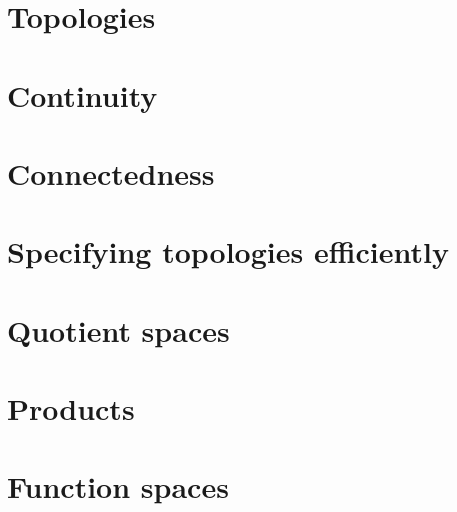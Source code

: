 \documentclass[a4paper,nobib,nols]{tufte-book}
\begin{document}
\section{Topologies}%
\label{sec:topologies}



\section{Continuity}%
\label{sec:connectedness}



\section{Connectedness}%
\label{sec:connectedness}

\section{Specifying topologies efficiently}%
\label{sec:specifying_topologies_efficiently}

\section{Quotient spaces}%
\label{sec:quotient_spaces}

\section{Products}%
\label{sec:products}

\section{Function spaces}%
\label{sec:function_spaces}
\end{document}

